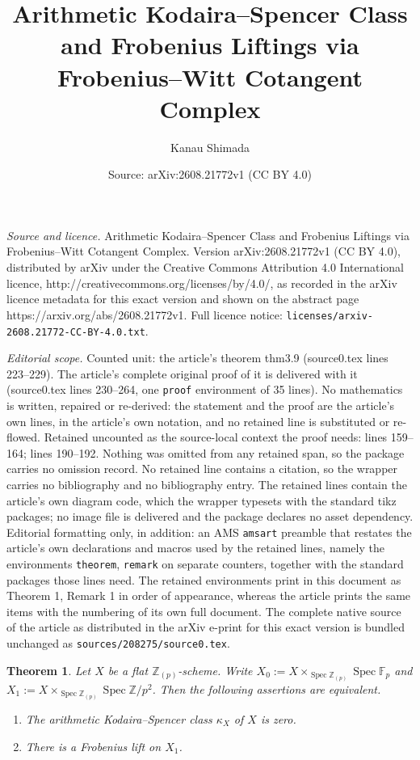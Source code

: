 \documentclass[10pt,a4paper]{amsart}
\title{Arithmetic Kodaira--Spencer Class and Frobenius Liftings via Frobenius--Witt Cotangent Complex}
\author{Kanau Shimada}
\date{Source: arXiv:2608.21772v1 (CC BY 4.0)}
\newtheorem{theorem}{Theorem}
\begin{document}
\maketitle

\noindent\emph{Source and licence.} Arithmetic Kodaira--Spencer Class and Frobenius Liftings via Frobenius--Witt Cotangent Complex. Version arXiv:2608.21772v1 (CC BY 4.0), distributed by arXiv under the Creative Commons Attribution 4.0 International licence, http://creativecommons.org/licenses/by/4.0/, as recorded in the arXiv licence metadata for this exact version and shown on the abstract page https://arxiv.org/abs/2608.21772v1. Full licence notice: \texttt{licenses/arxiv-2608.21772-CC-BY-4.0.txt}.\par\smallskip

\noindent\textit{Editorial scope.} Counted unit: the article's theorem thm3.9 (source0.tex lines 223--229). The article's complete original proof of it is delivered with it (source0.tex lines 230--264, one \texttt{proof} environment of 35 lines). No mathematics is written, repaired or re-derived: the statement and the proof are the article's own lines, in the article's own notation, and no retained line is substituted or re-flowed.  Retained uncounted as the source-local context the proof needs: lines 159--164; lines 190--192.  Nothing was omitted from any retained span, so the package carries no omission record.  No retained line contains a citation, so the wrapper carries no bibliography and no bibliography entry.  The retained lines contain the article's own diagram code, which the wrapper typesets with the standard tikz packages; no image file is delivered and the package declares no asset dependency.  Editorial formatting only, in addition: an AMS \texttt{amsart} preamble that restates the article's own declarations and macros used by the retained lines, namely the environments \texttt{theorem}, \texttt{remark} on separate counters, together with the standard packages those lines need.  The retained environments print in this document as Theorem 1, Remark 1 in order of appearance, whereas the article prints the same items with the numbering of its own full document.  The complete native source of the article as distributed in the arXiv e-print for this exact version is bundled unchanged as \texttt{sources/208275/source0.tex}.
\begin{theorem}\label{thm3.2}
    Let $X$ be a flat $\mathbb Z_{(p)}$-scheme. Write $X_0:=X\times _{\operatorname{Spec}\mathbb Z_{(p)}}\operatorname{Spec}\mathbb F_p$ and  $X_1:=X\times _{\operatorname{Spec}\mathbb Z_{(p)}}\operatorname{Spec}\mathbb Z/p^2$. Then the following assertions are equivalent.\begin{enumerate}
        \item The arithmetic Kodaira--Spencer class $\kappa_X$ of $X$ is zero.
        \item There is a Frobenius lift on $X_1$.
    \end{enumerate}
\end{theorem}
\end{document}
